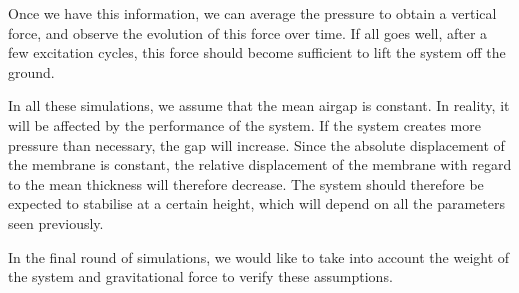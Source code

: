 Once we have this information, we can average the pressure to obtain a vertical
force, and observe the evolution of this force over time. If all goes well,
after a few excitation cycles, this force should become sufficient to lift the
system off the ground.

In all these simulations, we assume that the mean airgap is constant. In
reality, it will be affected by the performance of the system. If the system
creates more pressure than necessary, the gap will increase. Since the absolute
displacement of the membrane is constant, the relative displacement of the
membrane with regard to the mean thickness will therefore decrease. The system
should therefore be expected to stabilise at a certain height, which will depend
on all the parameters seen previously.

In the final round of simulations, we would like to take into account the weight
of the system and gravitational force to verify these assumptions.
